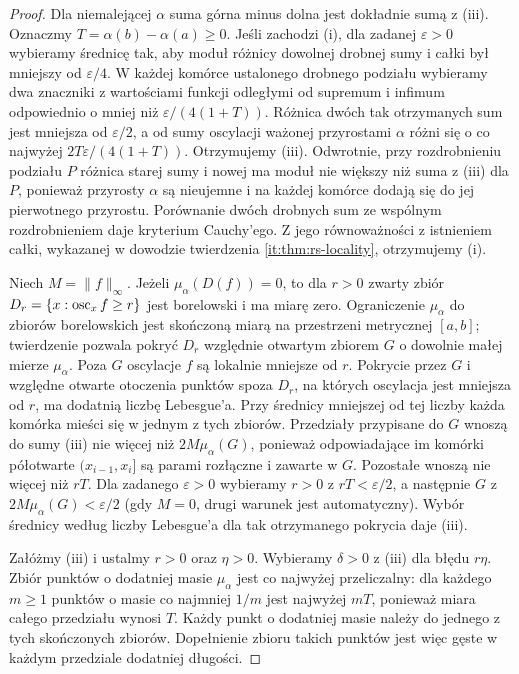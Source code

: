 \begin{proof}
Dla niemalejącej $\alpha$ suma górna minus dolna jest dokładnie sumą z (iii). Oznaczmy $T=\alpha(b)-\alpha(a)\ge0$. Jeśli zachodzi (i), dla zadanej $\varepsilon>0$ wybieramy średnicę tak, aby moduł różnicy dowolnej drobnej sumy i całki był mniejszy od $\varepsilon/4$. W każdej komórce ustalonego drobnego podziału wybieramy dwa znaczniki z wartościami funkcji odległymi od supremum i infimum odpowiednio o mniej niż $\varepsilon/(4(1+T))$. Różnica dwóch tak otrzymanych sum jest mniejsza od $\varepsilon/2$, a od sumy oscylacji ważonej przyrostami $\alpha$ różni się o co najwyżej $2T\varepsilon/(4(1+T))$. Otrzymujemy (iii). Odwrotnie, przy rozdrobnieniu podziału $P$ różnica starej sumy i nowej ma moduł nie większy niż suma z (iii) dla $P$, ponieważ przyrosty $\alpha$ są nieujemne i na każdej komórce dodają się do jej pierwotnego przyrostu. Porównanie dwóch drobnych sum ze wspólnym rozdrobnieniem daje kryterium Cauchy'ego. Z jego równoważności z istnieniem całki, wykazanej w dowodzie twierdzenia \ref{it:thm:rs-locality}, otrzymujemy (i).

Niech $M=\|f\|_\infty$. Jeżeli $\mu_\alpha(D(f))=0$, to dla $r>0$
zwarty zbiór $D_r=\{x:\operatorname{osc}_x f\ge r\}$ jest borelowski
i ma miarę zero. Ograniczenie $\mu_\alpha$ do zbiorów
borelowskich jest skończoną miarą na przestrzeni
metrycznej $[a,b]$; twierdzenie
pozwala pokryć $D_r$ względnie otwartym zbiorem $G$
o dowolnie małej mierze $\mu_\alpha$. Poza $G$ oscylacje $f$ są lokalnie mniejsze od $r$. Pokrycie przez $G$ i względne otwarte otoczenia punktów spoza $D_r$, na których oscylacja jest mniejsza od $r$, ma dodatnią liczbę Lebesgue'a. Przy średnicy mniejszej od tej liczby każda komórka mieści się w jednym z tych zbiorów. Przedziały przypisane do $G$ wnoszą do sumy (iii) nie więcej niż $2M\mu_\alpha(G)$, ponieważ odpowiadające im komórki półotwarte $(x_{i-1},x_i]$ są parami rozłączne i zawarte w $G$. Pozostałe wnoszą nie więcej niż $rT$. Dla zadanego $\varepsilon>0$ wybieramy $r>0$ z $rT<\varepsilon/2$, a następnie $G$ z $2M\mu_\alpha(G)<\varepsilon/2$ (gdy $M=0$, drugi warunek jest automatyczny). Wybór średnicy według liczby Lebesgue'a dla tak otrzymanego pokrycia daje (iii).

Załóżmy (iii) i ustalmy $r>0$ oraz $\eta>0$. Wybieramy $\delta>0$ z (iii) dla błędu $r\eta$. Zbiór punktów o dodatniej masie $\mu_\alpha$ jest co najwyżej przeliczalny: dla każdego $m\ge1$ punktów o masie co najmniej $1/m$ jest najwyżej $mT$, ponieważ miara całego przedziału wynosi $T$. Każdy punkt o dodatniej masie należy do jednego z tych skończonych zbiorów. Dopełnienie zbioru takich punktów jest więc gęste w każdym przedziale dodatniej długości.


\end{proof}
